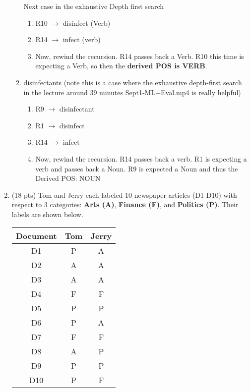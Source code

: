 \documentclass[11pt]{article}
\begin{document}
\begin{enumerate}
\begin{enumerate}
\begin{enumerate}
    \end{enumerate} 
    
	Next case in the exhaustive Depth first search    
    
    \begin{enumerate}
    
    \item R10 $\rightarrow$ disinfect (Verb)
    \item R14 $\rightarrow$ infect (verb)
    \item Now, rewind the recursion. R14 passes back a Verb. R10 this time is expecting a Verb, so then the \textbf{derived POS is VERB}.
    
    \end{enumerate} 

\item disinfectants (note this is a case where the exhaustive depth-first search in the lecture around 39 minutes Sept1-ML+Eval.mp4 is really helpful)

    \begin{enumerate}
    
    \item R9 $\rightarrow$ disinfectant
    \item R1 $\rightarrow$ disinfect
    \item R14 $\rightarrow$ infect
    \item Now, rewind the recursion. R14 passes back a verb. R1 is expecting a verb and passes back a Noun. R9 is expected a Noun and thus the Derived POS: NOUN
    
    \end{enumerate} 

\end{enumerate}


\newpage

\item (18 pts) Tom and Jerry each labeled 10 newspaper articles
  (D1-D10) with respect to 3 categories: {\bf Arts (A)}, {\bf
    Finance (F)}, and {\bf Politics (P)}. Their labels are shown
  below.

\begin{center}
\begin{tabular}{|c|cc|} \hline
{\bf Document} & {\bf Tom} & {\bf Jerry} \\ \hline
D1 & P & A \\ \hline
D2 & A & A \\ \hline
D3 & A & A \\ \hline
D4 & F & F \\ \hline
D5 & P & P \\ \hline
D6 & P & A \\ \hline
D7 & F & F \\ \hline
D8 & A & P \\ \hline
D9 & P & P \\ \hline
D10 & P & F \\ \hline
\end{tabular}
\end{center}


\end{enumerate}
\end{document}
